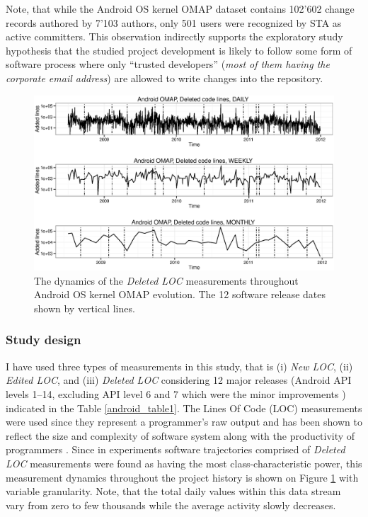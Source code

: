 Note, that while the Android OS kernel OMAP dataset contains 102'602 change records authored by 7'103 authors, only 501 users were recognized by STA as active committers. This observation indirectly supports the exploratory study hypothesis that the studied project development is likely to follow some form of software process where only ``trusted developers'' (\textit{most of them having the corporate email address}) are allowed to write changes into the repository.

\begin{figure}[t]
   \centering
   \includegraphics[width=145mm]{figures/omap_removed_lines_plot.eps}
   \caption{The dynamics of the \textit{Deleted LOC} measurements throughout Android OS kernel OMAP evolution. 
   The 12 software release dates shown by vertical lines.}
   \label{fig:OMAP_dynamics}
\end{figure}

\subsubsection{Study design}
I have used three types of measurements in this study, that is (i) \textit{New LOC}, (ii) \textit{Edited LOC}, and (iii) \textit{Deleted LOC} considering 12 major releases (Android API levels 1--14, excluding API level 6 and 7 which were the minor improvements \cite{api-levels}) indicated in the Table \ref{android_table1}. The Lines Of Code (LOC) measurements were used since they represent a programmer's raw output and has been shown to reflect the size and complexity of software system along with the productivity of programmers  \cite{citeulike:341464} \cite{citeulike:13410945} \cite{citeulike:13410947}. Since in experiments  software trajectories comprised of \textit{Deleted LOC} measurements were found as having the most class-characteristic power, this measurement dynamics throughout the project history is shown on Figure \ref{fig:OMAP_dynamics} with variable granularity. Note, that the total daily values within this data stream vary from zero to few thousands while the average activity slowly decreases.

